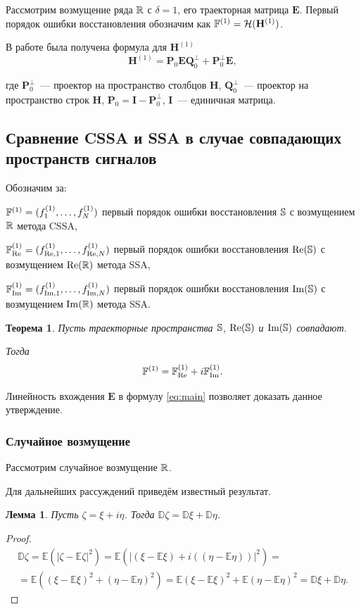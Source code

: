 \documentclass{spisok-article}
\newtheorem{theorem}{Теорема}%
\newtheorem{lemma}{Лемма}%
\begin{document}
Рассмотрим возмущение ряда $\mathbb{R}$ с $\delta = 1$, его траекторная матрица $\mathbf{E}$. Первый порядок ошибки восстановления обозначим как $\mathbb{F}^{(1)} = \mathcal{H}(\mathbf{H}^{(1)})$. 

В работе \cite{Konstantinov} была получена формула для $\mathbf{H}^{(1)}$
\begin{equation} \label{eq:main}
	\mathbf{H}^{(1)} = \mathbf{P}_0 \mathbf{E} \mathbf{Q}^{\perp}_0 + \mathbf{P}^{\perp}_0 \mathbf{E},
\end{equation}

где $\mathbf{P}^{\perp}_0$~--- проектор на пространство столбцов $\mathbf{H}$, $\mathbf{Q}^{\perp}_0$~--- проектор на пространство строк $\mathbf{H}$, $\mathbf{P}_0 = \mathbf{I} - \mathbf{P}^{\perp}_0$, $\mathbf{I}$~--- единичная матрица.

\subsection{Сравнение CSSA и SSA в случае совпадающих пространств сигналов}

Обозначим за:

$\mathbb{F}^{(1)} = (f^{(1)}_1, \ldots, f^{(1)}_N)$ первый порядок ошибки восстановления $\mathbb{S}$ с возмущением $\mathbb{R}$ метода CSSA,

$\mathbb{F}^{(1)}_{\Re} = (f^{(1)}_{\Re,1}, \ldots, f^{(1)}_{\Re, N})$ первый порядок ошибки восстановления $\Re(\mathbb{S})$ с возмущением $\Re(\mathbb{R})$ метода SSA,

$\mathbb{F}^{(1)}_{\Im} = (f^{(1)}_{\Im,1}, \ldots, f^{(1)}_{\Im, N})$ первый порядок ошибки восстановления $\Im(\mathbb{S})$ с возмущением $\Im(\mathbb{R})$ метода SSA.


\begin{theorem}\label{th:sum}
Пусть траекторные пространства $\mathbb{S}$, $\Re(\mathbb{S})$ и $\Im(\mathbb{S})$ совпадают.

Тогда $$\mathbb{F}^{(1)} = \mathbb{F}^{(1)}_{\Re} + i\mathbb{F}^{(1)}_{\Im}.$$
\end{theorem}

Линейность вхождения $\mathbf{E}$ в формулу \eqref{eq:main} позволяет доказать данное утверждение.

\subsubsection{Случайное возмущение}

Рассмотрим случайное возмущение $\mathbb{R}$.

Для дальнейших рассуждений приведём известный результат.
\begin{lemma} \label{std:disp}
Пусть $\zeta = \xi + i\eta$. Тогда $\mathbb{D}\zeta = \mathbb{D}\xi + \mathbb{D}\eta$.
\end{lemma}
\begin{proof}
\begin{multline*}
	\mathbb{D}\zeta = \mathbb{E}(|\zeta - \mathbb{E}\zeta|^2) = \mathbb{E}(|(\xi - \mathbb{E}\xi) + i((\eta - \mathbb{E}\eta))|^2) = \\
	= \mathbb{E}((\xi - \mathbb{E}\xi)^2 + (\eta - \mathbb{E}\eta)^2)= \mathbb{E}(\xi - \mathbb{E}\xi)^2 + \mathbb{E}(\eta - \mathbb{E}\eta)^2 = \mathbb{D}\xi + \mathbb{D}\eta.
\end{multline*}
\end{proof}
\end{document}
